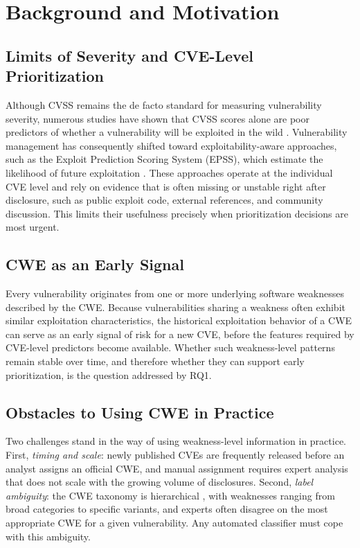 \documentclass[conference,compsoc]{IEEEtran}
\begin{document}
\section{Background and Motivation}
\label{sec:motivation}


\subsection{Limits of Severity and CVE-Level Prioritization}
Although CVSS remains the de facto standard for measuring vulnerability severity, numerous studies have shown that CVSS scores alone are poor predictors of whether a vulnerability will be exploited in the wild \cite{jacobs2023epss,sherif2026kri,jiang2025survey,khoury2025mining}. Vulnerability management has consequently shifted toward exploitability-aware approaches, such as the Exploit Prediction Scoring System (EPSS), which estimate the likelihood of future exploitation \cite{jacobs2023epss}. These approaches operate at the individual CVE level and rely on evidence that is often missing or unstable right after disclosure, such as public exploit code, external references, and community discussion. %
This limits their usefulness precisely when prioritization decisions are most urgent.

\subsection{CWE as an Early Signal}
Every vulnerability originates from one or more underlying software weaknesses described by the CWE. Because vulnerabilities sharing a weakness often exhibit similar exploitation characteristics, the historical exploitation behavior of a CWE can serve as an early signal of risk for a new CVE, before the features required by CVE-level predictors become available. %
Whether such weakness-level patterns remain stable over time, and therefore whether they can support early prioritization, is the question addressed by RQ1.

\subsection{Obstacles to Using CWE in Practice}
Two challenges stand in the way of using weakness-level information in practice.
First, \emph{timing and scale}: newly published CVEs are frequently released before an analyst assigns an official CWE, and manual assignment requires expert analysis that does not scale with the growing volume of disclosures.
Second, \emph{label ambiguity}: the CWE taxonomy is hierarchical \cite{Bojanova}, with weaknesses ranging from broad categories to specific variants, and experts often disagree on the most appropriate CWE for a given vulnerability. Any automated classifier must cope with this ambiguity.
\end{document}
